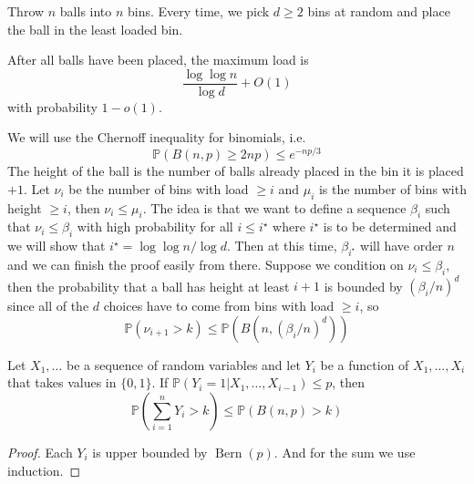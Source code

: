 Throw $n$ balls into $n$ bins.
Every time, we pick $d\ge 2$ bins at random and place the ball in the least loaded bin.
\begin{theorem}
    After all balls have been placed, the maximum load is
    $$\frac{\log\log n}{\log d}+O(1)$$
    with probability $1-o(1)$.
\end{theorem}
We will use the Chernoff inequality for binomials, i.e.
$$\mathbb P(B(n,p)\ge 2np)\le e^{-np/3}$$
The height of the ball is the number of balls already placed in the bin it is placed $+1$.
Let $\nu_i$ be the number of bins with load $\ge i$ and $\mu_i$ is the number of bins with height $\ge i$, then $\nu_i\le \mu_i$.
The idea is that we want to define a sequence $\beta_i$ such that $\nu_i\le\beta_i$ with high probability for all $i\le i^\star$ where $i^\star$ is to be determined and we will show that $i^\star=\log\log n/\log d$.
Then at this time, $\beta_{i^\star}$ will have order $n$ and we can finish the proof easily from there.
Suppose we condition on $\nu_i\le\beta_i$, then the probability that a ball has height at least $i+1$ is bounded by $(\beta_i/n)^d$ since all of the $d$ choices have to come from bins with load $\ge i$, so
$$\mathbb P(\nu_{i+1}>k)\le\mathbb P(B(n,(\beta_i/n)^d))$$
\begin{lemma}
    Let $X_1,\ldots$ be a sequence of random variables and let $Y_i$ be a function of $X_1,\ldots,X_i$ that takes values in $\{0,1\}$.
    If $\mathbb P(Y_i=1|X_1,\ldots,X_{i-1})\le p$, then
    $$\mathbb P\left( \sum_{i=1}^nY_i>k \right)\le\mathbb P(B(n,p)>k)$$
\end{lemma}
\begin{proof}
    Each $Y_i$ is upper bounded by $\operatorname{Bern}(p)$.
    And for the sum we use induction.
\end{proof}
